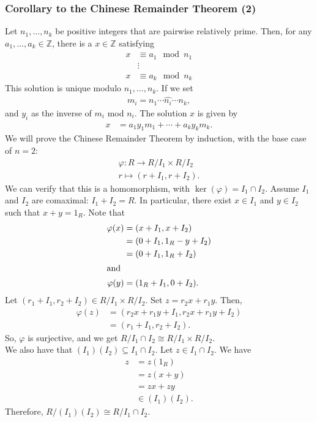 \documentclass[10pt]{extarticle}
\newcommand{\Z}{\mathbb{Z}}
\begin{document}
  \subsubsection{Corollary to the Chinese Remainder Theorem (2)}%
  Let $n_1,\dots,n_k$ be positive integers that are pairwise relatively prime. Then, for any $a_1,\dots,a_k\in\Z$, there is a $x\in\Z$ satisfying
  \begin{align*}
   x &\equiv a_1\mod n_1\\
     &\vdots\\
   x &\equiv a_k\mod n_k
  \end{align*}
  This solution is unique modulo $n_1,\dots,n_k$. If we set
  \begin{align*}
   m_i = n_1\cdots \hat{n_i}\cdots n_k,
  \end{align*}
  and $y_i$ as the inverse of $m_i$ mod $n_i$. The solution $x$ is given by
  \begin{align*}
   x &= a_1y_1m_1 + \cdots + a_ky_km_k.
  \end{align*}
  We will prove the Chinese Remainder Theorem by induction, with the base case of $n=2$:
  \begin{align*}
   \varphi: R\rightarrow R/I_1 \times R/I_2\\
   r \mapsto (r+I_1,r+I_2).
  \end{align*}
  We can verify that this is a homomorphism, with $\ker(\varphi) = I_1\cap I_2$. Assume $I_1$ and $I_2$ are comaximal: $I_1 + I_2 = R$. In particular, there exist $x\in I_1$ and $y\in I_2$ such that $x + y = 1_R$. Note that
  \begin{align*}
   \varphi(x) &= (x+I_1,x+I_2) \\
              &= (0+I_1,1_R - y + I_2)\\
              &= (0+I_1,1_R + I_2)\\
              \intertext{and}
   \varphi(y) &= (1_R + I_1,0+I_2).
  \end{align*}
  Let $(r_1 + I_1,r_2 + I_2)\in R/I_1 \times R/I_2$. Set $z = r_2x + r_1y$. Then,
  \begin{align*}
   \varphi(z) &= (r_2x + r_1y + I_1,r_2x + r_1y + I_2)\\
              &= (r_1 + I_1,r_2 + I_2).
  \end{align*}
  So, $\varphi$ is surjective, and we get $R/I_1\cap I_2 \cong R/I_1\times R/I_2$.\\

  We also have that $(I_1)(I_2)\subseteq I_1\cap I_2$. Let $z\in I_1\cap I_2$. We have
  \begin{align*}
   z &= z(1_R)\\
   &= z(x+y)\\
   &= zx + zy\\
   &\in (I_1)(I_2).
  \end{align*}
  Therefore, $R/(I_1)(I_2)\cong R/I_1\cap I_2$.\\
\end{document}
